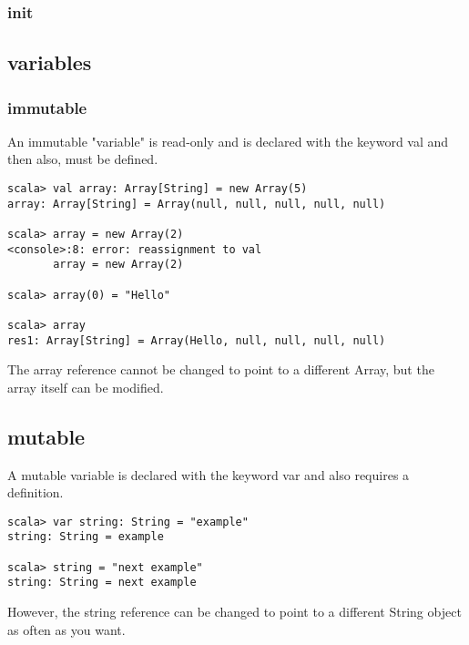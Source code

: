 \documentclass[12pt]{article}
\begin{document}
\subsubsection{init}





\subsection{variables}

\subsubsection{immutable}

An immutable "variable" is read-only and is declared with the keyword \textsf{val} and then also, must be defined.

\begin{verbatim}
scala> val array: Array[String] = new Array(5)
array: Array[String] = Array(null, null, null, null, null)

scala> array = new Array(2)
<console>:8: error: reassignment to val
       array = new Array(2)
       
scala> array(0) = "Hello"

scala> array
res1: Array[String] = Array(Hello, null, null, null, null)
\end{verbatim}

The \textsf{array} reference cannot be changed to point to a different \textsf{Array}, but the array itself
can be modified.


\subsection{mutable}

A mutable variable is declared with the keyword \textsf{var} and also requires a definition.

\begin{verbatim}
scala> var string: String = "example"
string: String = example

scala> string = "next example"
string: String = next example
\end{verbatim}

However, the \textsf{string} reference can be changed to point to a different \textsf{String} object as often as you want.
\end{document}

